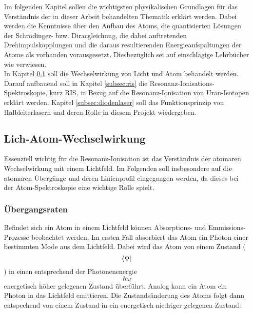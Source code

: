 Im folgenden Kapitel sollen die wichtigsten physikalischen Grundlagen für das
Verständnis der in dieser Arbeit behandelten Thematik erklärt werden. Dabei werden die
Kenntnisse über den Aufbau des Atoms, die quantisierten Lösungen der
Schrödinger- bzw. Diracgleichung, die dabei auftretenden Drehimpulskopplungen
und die daraus resultierenden Energieaufspaltungen der Atome als vorhanden
vorausgesetzt. Diesbezüglich sei auf einschlägige Lehrbücher wie
\cite{demtroeder:ex3} verwiesen.\\
In Kapitel \ref{subsec:licht-atom-wechselwirkung} soll die Wechselwirkung von
Licht und Atom behandelt werden. Darauf aufbauend soll
in Kapitel \ref{subsec:ris} die Resonanz-Ionisations-Spektroskopie,
kurz RIS, in Bezug auf die Resonanz-Ionisation von Uran-Isotopen erklärt
werden. Kapitel \ref{subsec:diodenlaser} soll das Funktionsprinzip von
Halbleiterlasern und deren Rolle in diesem Projekt wiedergeben.

\subsection{Lich-Atom-Wechselwirkung}\label{subsec:licht-atom-wechselwirkung}

Essenziell wichtig für die Resonanz-Ionisation ist das Verständnis der atomaren
Wechselwirkung mit einem Lichtfeld. Im Folgenden soll insbesondere auf die
atomaren Übergänge und deren Linienprofil eingegangen werden, da dieses bei der
Atom-Spektroskopie eine wichtige Rolle spielt.




\subsubsection{Übergangsraten}\label{subsec:uebergangsraten}
Befindet sich ein Atom in einem Lichtfeld können Absorptions- und
Emmissions-Prozesse beobachtet werden. Im ersten Fall absorbiert das Atom ein
Photon einer bestimmten Mode aus dem Lichtfeld. Dabei wird das Atom von einem
Zustand ($$\left< \Psi \right|$$) in einen entsprechend der Photonenenergie
$$\hbar\omega$$ energetisch höher gelegenen Zustand überführt. Analog kann ein Atom ein Photon in das Lichtfeld
emittieren. Die Zustandsänderung des Atoms folgt dann entspechend von einem
Zustand in ein energetisch niedriger gelegenen Zustand.\\


